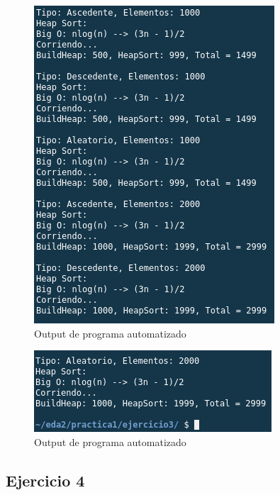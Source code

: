 \documentclass{article}
\begin{document}
\begin{figure}[H]
\begin{multicols}{2}
					\includegraphics[width = \linewidth]{images/e3-9}\par
				\end{multicols}
				\caption{Output de programa automatizado}
			\end{figure}
		
			\begin{figure}[H]
				\centering
				\includegraphics[scale = 0.8]{images/e3-10}
				\caption{Output de programa automatizado}
			\end{figure}
			
		\newpage
		
		\subsection{Ejercicio 4}
		
\end{document}
